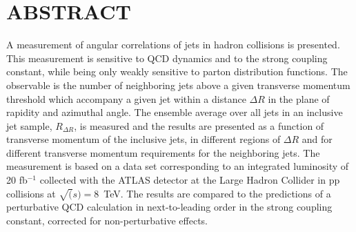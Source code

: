 \chapter*{ABSTRACT}

{\bf 


A measurement of angular correlations of jets in hadron collisions is presented. This measurement is sensitive to QCD dynamics and to the strong coupling constant, while being only weakly sensitive to parton distribution functions. The observable is the number of neighboring jets above a given transverse momentum threshold which accompany a given jet within a distance $\Delta R$ in the plane of rapidity and azimuthal angle. The ensemble average over all jets in an inclusive jet sample, $R_{\Delta R}$, is measured and the results are presented as a function of transverse momentum of the inclusive jets, in different regions of $\Delta R$ and for different transverse momentum requirements for the neighboring jets. The measurement is based on a data set corresponding to an integrated luminosity of 20 fb$^{-1}$ collected with the ATLAS detector at the Large Hadron Collider in pp collisions at $\sqrt(s)=8$~TeV. The results are compared to the predictions of a perturbative QCD calculation in next-to-leading order in the strong coupling constant, corrected for non-perturbative effects.


}

